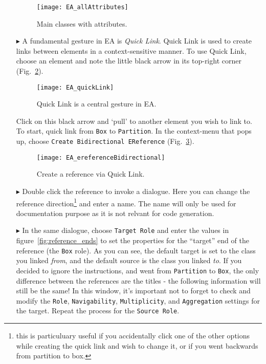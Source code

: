 \begin{itemize}
\begin{figure}[htbp]
	\centering
  \texttt{[image: EA\_allAttributes]}
	\caption{Main classes with attributes.}
	\label{fig:attribute_completed}
\end{figure}
\FloatBarrier

\pagebreak

\item[$\blacktriangleright$] A fundamental gesture in EA is \emph{Quick Link}.
Quick Link is used to create links between elements in a context-sensitive manner.
To use Quick Link, choose an element and note the little black arrow in its top-right corner (Fig.~\ref{fig:quicklink}).

\begin{figure}[htbp]
	\centering
  \texttt{[image: EA\_quickLink]}
	\caption{Quick Link is a central gesture in EA.}
	\label{fig:quicklink}
\end{figure}
\FloatBarrier

Click on this black arrow and `pull' to another element you wish to link to.
To start, quick link from \texttt{Box} to \texttt{Partition}.
In the context-menu that pops up, choose \texttt{Create Bidirectional EReference} (Fig.~\ref{fig:ereference}).

\begin{figure}[htbp]
	\centering
  \texttt{[image: EA\_ereferenceBidirectional]}
	\caption{Create a reference via Quick Link.}
	\label{fig:ereference}
\end{figure}
\FloatBarrier

\item[$\blacktriangleright$] Double click the reference to invoke a dialogue.
Here you can change the reference direction\footnote{this is particuluary useful if you accidentally click one of the other options while creating the quick link and wish to change it, or if you went backwards from partition to box.} and enter a name. The name will only be used for documentation purpose as it is not relvant for code generation.

\item[$\blacktriangleright$] In the same dialogue, choose \texttt{Target Role} and enter the values in figure~\ref{fig:reference_ends} to set the properties for the ``target'' end of the reference (the \texttt{Box} role). As you can see, the default target is set to the class you linked \emph{from}, and the default source is the class you linked \emph{to}. If you decided to ignore the instructions, and went from \texttt{Partition} to \texttt{Box}, the only difference between the references are the titles - the following information will still be the same! In this window, it's important not to forget to check and modify the \texttt{Role}, \texttt{Navigability}, \texttt{Multiplicity}, and \texttt{Aggregation} settings for the target.  Repeat the process for the \texttt{Source Role}.


\end{itemize}
